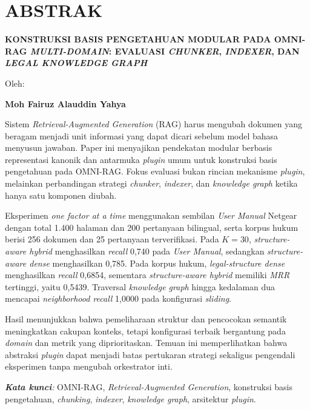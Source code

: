 \clearpage
\chapter*{ABSTRAK}

\begin{center}
    \begin{singlespace}
        {\large\bfseries KONSTRUKSI BASIS PENGETAHUAN MODULAR PADA OMNI-RAG \emph{MULTI-DOMAIN}: EVALUASI \emph{CHUNKER}, \emph{INDEXER}, DAN \emph{LEGAL KNOWLEDGE GRAPH}}

        {\normalfont\normalsize Oleh:}

        {\bfseries Moh Fairuz Alauddin Yahya}
    \end{singlespace}
\end{center}

\begin{singlespace}
    \small

    Sistem \emph{Retrieval-Augmented Generation} (RAG) harus mengubah dokumen yang beragam menjadi unit informasi yang dapat dicari sebelum model bahasa menyusun jawaban. Paper ini menyajikan pendekatan modular berbasis representasi kanonik dan antarmuka \emph{plugin} umum untuk konstruksi basis pengetahuan pada OMNI-RAG. Fokus evaluasi bukan rincian mekanisme \emph{plugin}, melainkan perbandingan strategi \emph{chunker}, \emph{indexer}, dan \emph{knowledge graph} ketika hanya satu komponen diubah.

    Eksperimen \emph{one factor at a time} menggunakan sembilan \emph{User Manual} Netgear dengan total 1.400 halaman dan 200 pertanyaan bilingual, serta korpus hukum berisi 256 dokumen dan 25 pertanyaan terverifikasi. Pada $K=30$, \emph{structure-aware hybrid} menghasilkan \emph{recall} 0,740 pada \emph{User Manual}, sedangkan \emph{structure-aware dense} menghasilkan 0,785. Pada korpus hukum, \emph{legal-structure dense} menghasilkan \emph{recall} 0,6854, sementara \emph{structure-aware hybrid} memiliki \emph{MRR} tertinggi, yaitu 0,5439. Traversal \emph{knowledge graph} hingga kedalaman dua mencapai \emph{neighborhood recall} 1,0000 pada konfigurasi \emph{sliding}.

    Hasil menunjukkan bahwa pemeliharaan struktur dan pencocokan semantik meningkatkan cakupan konteks, tetapi konfigurasi terbaik bergantung pada \emph{domain} dan metrik yang diprioritaskan. Temuan ini memperlihatkan bahwa abstraksi \emph{plugin} dapat menjadi batas pertukaran strategi sekaligus pengendali eksperimen tanpa mengubah orkestrator inti.

    \textit{\textbf{Kata kunci}:} OMNI-RAG, \emph{Retrieval-Augmented Generation}, konstruksi basis pengetahuan, \emph{chunking}, \emph{indexer}, \emph{knowledge graph}, arsitektur \emph{plugin}.
\end{singlespace}

\clearpage
